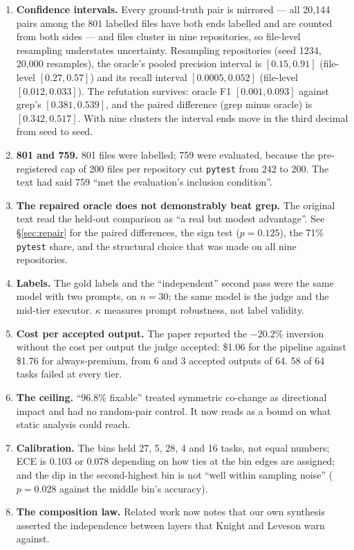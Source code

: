 \documentclass[sigconf,review,anonymous]{acmart}
\begin{document}
\begin{enumerate}
\item \textbf{Confidence intervals.} Every ground-truth pair is mirrored --- all 20,144 pairs among
the 801 labelled files have both ends labelled and are counted from both sides --- and files
cluster in nine repositories, so file-level resampling understates uncertainty. Resampling
repositories (seed 1234, 20,000 resamples), the oracle's pooled precision interval is
$[0.15, 0.91]$ (file-level $[0.27, 0.57]$) and its recall interval $[0.0005, 0.052]$ (file-level
$[0.012, 0.033]$). The refutation survives: oracle F1 $[0.001, 0.093]$ against grep's
$[0.381, 0.539]$, and the paired difference (grep minus oracle) is $[0.342, 0.517]$. With nine
clusters the interval ends move in the third decimal from seed to seed.
\item \textbf{801 and 759.} 801 files were labelled; 759 were evaluated, because the pre-registered
cap of 200 files per repository cut \texttt{pytest} from 242 to 200. The text had said 759 ``met
the evaluation's inclusion condition''.
\item \textbf{The repaired oracle does not demonstrably beat grep.} The original text read the
held-out comparison as ``a real but modest advantage''. See \S\ref{sec:repair} for the paired
differences, the sign test ($p = 0.125$), the 71\% \texttt{pytest} share, and the structural
choice that was made on all nine repositories.
\item \textbf{Labels.} The gold labels and the ``independent'' second pass were the same model with
two prompts, on $n = 30$; the same model is the judge and the mid-tier executor. $\kappa$ measures
prompt robustness, not label validity.
\item \textbf{Cost per accepted output.} The paper reported the $-20.2\%$ inversion without the cost
per output the judge accepted: \$1.06 for the pipeline against \$1.76 for always-premium, from 6
and 3 accepted outputs of 64. 58 of 64 tasks failed at every tier.
\item \textbf{The ceiling.} ``$96.8\%$ fixable'' treated symmetric co-change as directional impact
and had no random-pair control. It now reads as a bound on what static analysis could reach.
\item \textbf{Calibration.} The bins held 27, 5, 28, 4 and 16 tasks, not equal numbers; ECE is
0.103 or 0.078 depending on how ties at the bin edges are assigned; and the dip in the
second-highest bin is not ``well within sampling noise'' ($p = 0.028$ against the middle bin's
accuracy).
\item \textbf{The composition law.} Related work now notes that our own synthesis asserted the
independence between layers that Knight and Leveson warn against.
\end{enumerate}
\end{document}
